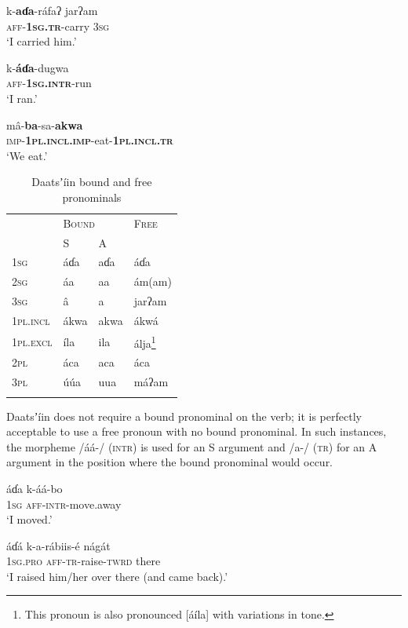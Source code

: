 \documentclass[output=paper]{langsci/langscibook}
\begin{document}
\ea\label{ex:ahlandc:16}
\gll
k-\textbf{aɗa}{}-ráfaʔ   jarʔam \\ 
\textsc{aff-}\textbf{\textsc{1sg.tr}}{}-carry  \textsc{3sg} \\
\glt
‘I carried him.’
\z

\ea\label{ex:ahlandc:17}
\gll
k-\textbf{áɗa}{}-dugwa \\
\textsc{aff-\textbf{1sg.intr}}-run   \\
\glt
‘I ran.’
\z

\ea\label{ex:ahlandc:18}
\gll
m\^{a}-\textbf{ba}{}-sa-\textbf{akwa} \\
\textsc{imp-}\textbf{\textsc{1pl.incl.imp}}{}-eat-\textbf{\textsc{1pl.incl.tr}} \\
\glt
‘We eat.’
\z


\begin{table}
\begin{tabularx}{\textwidth}{XXXX}
\lsptoprule 
& \multicolumn{2}{X}{\scshape Bound} & \scshape Free\\
& S & A & \\
\midrule
\scshape 1sg & áɗa & aɗa & áɗa\\
\scshape 2sg & áa &  aa &  ám(am)\\
\scshape 3sg &  â & a &  jarʔam\\
\scshape 1pl.incl &  ákwa &  akwa &  ákwá\\
\scshape 1pl.excl & íla &  ila &  álja\footnote{This pronoun is also pronounced [áíla] with variations in tone.} \\
\scshape 2pl & áca &  aca & áca\\
\scshape 3pl & \'{u}\'{u}a & uua &  máʔam\\
\lspbottomrule
\end{tabularx}
\caption{Daatsʼíin bound and free pronominals}
\label{tab:ahlandc:4}
\end{table}

Daatsʼíin does not require a bound pronominal on the verb; it is perfectly acceptable to use a free pronoun with no bound pronominal. In such instances, the morpheme /áá-/ (\textsc{intr}) is used for an S argument  and /a-/ (\textsc{tr}) for an A argument  in the position where the bound pronominal would occur.  

\ea\label{ex:ahlandc:19}
\gll
áɗa   k-áá-bo \\
1\textsc{sg}    \textsc{aff-intr-}move.away \\
\glt
‘I moved.’
\z

\ea\label{ex:ahlandc:20}
\gll 
áɗá  k-a-r\'{a}biis-é nágát\footnotemark \\
\textsc{1sg.pro}  \textsc{aff-tr}{}-raise-\textsc{twrd}  there \\
\glt
‘I raised him/her over there (and came back).’ 
\z 
{}
\end{document}

